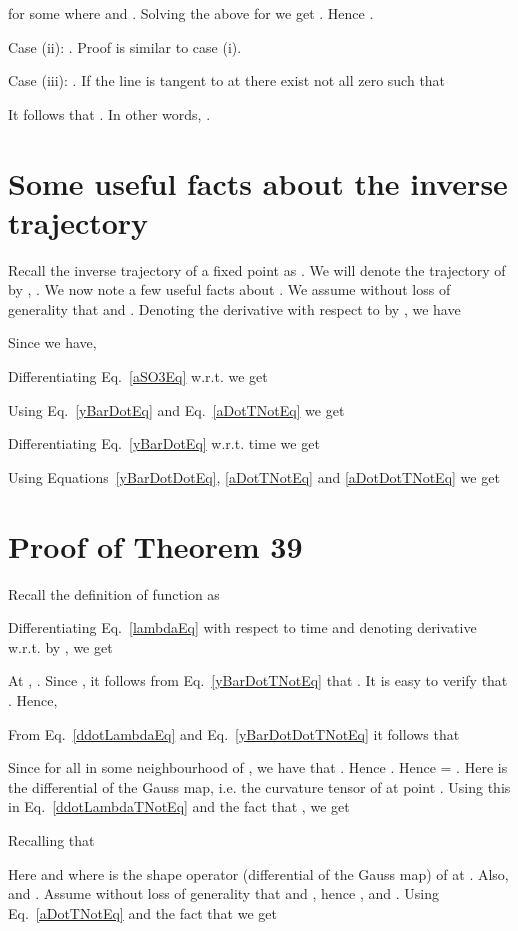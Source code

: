 \documentclass{elsart5p}
\begin{document}
for some  where  and .  Solving the above for  we get .
Hence .

Case (ii): .  Proof is similar to case (i).

Case (iii): . If the line  is 
tangent to  at  there exist  not all zero such that 

It follows that .  
In other words, .
\hfill 


\section{Some useful facts about the inverse trajectory} \label{invTrajSec}

Recall the inverse trajectory of a fixed point   as .
We will denote the trajectory of  by , .  We now note a few useful facts about . 
We assume without loss of generality that  and .  Denoting the derivative with respect to  by , we have

Since  we have,

Differentiating Eq.~\ref{aSO3Eq} w.r.t.  we get

Using Eq.~\ref{yBarDotEq} and Eq.~\ref{aDotTNotEq} we get

Differentiating Eq.~\ref{yBarDotEq} w.r.t. time we get

Using Equations~\ref{yBarDotDotEq}, \ref{aDotTNotEq} and \ref{aDotDotTNotEq} we get


\section{Proof of Theorem 39} \label{proofthm39Sec}
Recall the definition of function  as 

 Differentiating Eq.~\ref{lambdaEq} with respect to time and denoting derivative w.r.t.  by , we get

At , .  Since , it follows from Eq.~\ref{yBarDotTNotEq}  that .  It is easy to verify that .  Hence, 

From Eq.~\ref{ddotLambdaEq} and Eq.~\ref{yBarDotDotTNotEq} it follows that

Since   for all  in some neighbourhood  of , we have that .  
Hence .  
Hence  = .  
Here  is the differential of the Gauss map, i.e. the curvature tensor of 
 at point .  Using this in Eq.~\ref{ddotLambdaTNotEq} and the fact that  ,  we get

Recalling that  

Here  and  
where  is the shape operator (differential of the Gauss map) of  at .  
Also,  and .  Assume without loss of generality that  
and , hence ,  and . Using 
Eq.~\ref{aDotTNotEq} and the fact that   we get
\end{document}
